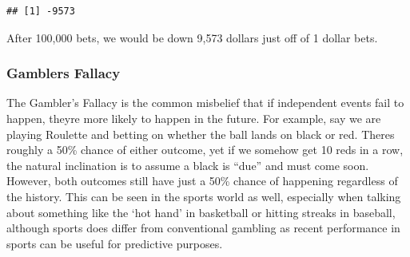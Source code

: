 \documentclass[]{article}
\newenvironment{Shaded}{\begin{snugshade}}{\end{snugshade}}
\newcommand{\CommentTok}[1]{\textcolor[rgb]{0.56,0.35,0.01}{\textit{#1}}}
\newcommand{\ControlFlowTok}[1]{\textcolor[rgb]{0.13,0.29,0.53}{\textbf{#1}}}
\newcommand{\DecValTok}[1]{\textcolor[rgb]{0.00,0.00,0.81}{#1}}
\newcommand{\FloatTok}[1]{\textcolor[rgb]{0.00,0.00,0.81}{#1}}
\newcommand{\KeywordTok}[1]{\textcolor[rgb]{0.13,0.29,0.53}{\textbf{#1}}}
\newcommand{\NormalTok}[1]{#1}
\newcommand{\OperatorTok}[1]{\textcolor[rgb]{0.81,0.36,0.00}{\textbf{#1}}}
\newcommand{\StringTok}[1]{\textcolor[rgb]{0.31,0.60,0.02}{#1}}
\begin{document}
\begin{Shaded}
\end{Shaded}

\begin{verbatim}
## [1] -9573
\end{verbatim}

After 100,000 bets, we would be down 9,573 dollars just off of 1 dollar
bets.

\hypertarget{gamblers-fallacy}{%
\subsubsection{Gamblers Fallacy}\label{gamblers-fallacy}}

The Gambler's Fallacy is the common misbelief that if independent events
fail to happen, theyre more likely to happen in the future. For example,
say we are playing Roulette and betting on whether the ball lands on
black or red. Theres roughly a 50\% chance of either outcome, yet if we
somehow get 10 reds in a row, the natural inclination is to assume a
black is ``due'' and must come soon. However, both outcomes still have
just a 50\% chance of happening regardless of the history. This can be
seen in the sports world as well, especially when talking about
something like the `hot hand' in basketball or hitting streaks in
baseball, although sports does differ from conventional gambling as
recent performance in sports can be useful for predictive purposes.
\end{document}
